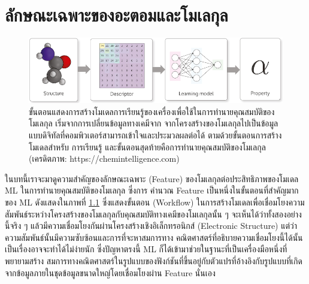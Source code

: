 

\chapter{ลักษณะเฉพาะของอะตอมและโมเลกุล}
\label{ch:feature}

\begin{figure}[htbp]
    \centering
    \includegraphics[width=\linewidth]{fig/workflow_chem_ml.png}
    \caption{ขั้นตอนแสดงการสร้างโมเดลการเรียนรู้ของเครื่องเพื่อใช้ในการทำนายคุณสมบัติของโมเลกุล เริ่มจากการเปลี่ยนข้อมูลทางเคมีจาก%
    จากโครงสร้างของโมเลกุลไปเป็นข้อมูลแบบดิจิทัลที่คอมพิวเตอร์สามารถเข้าใจและประมวลผลต่อได้ ตามด้วยขั้นตอนการสร้างโมเดลสำหรับ%
    การเรียนรู้ และขั้นตอนสุดท้ายคือการทำนายคุณสมบัติของโมเลกุล (เครดิตภาพ: https://chemintelligence.com)}
    \label{fig:workflow_chem_ml}
\end{figure}

ในบทนี้เราจะมาดูความสำคัญของลักษณะเฉพาะ (Feature) ของโมเลกุลต่อประสิทธิภาพของโมเดล ML ในการทำนายคุณสมบัติของโมเลกุล ซึ่งการ%
คำนวณ Feature เป็นหนึ่งในขั้นตอนที่สำคัญมากของ ML ดังแสดงในภาพที่ \ref{fig:workflow_chem_ml} ซึ่งแสดงขั้นตอน (Workflow) 
ในการสร้างโมเดลเพื่อเชื่อมโยงความสัมพันธ์ระหว่างโครงสร้างของโมเลกุลกับคุณสมบัติทางเคมีของโมเลกุลนั้น ๆ จะเห็นได้ว่าทั้งสองอย่างนี้จริง ๆ 
แล้วมีความเชื่อมโยงกันผ่านโครงสร้างเชิงอิเล็กทรอนิกส์ (Electronic Structure) แต่ว่าความสัมพันธ์นั้นมีความซับซ้อนและการที่จะหาสมการทาง%
คณิตศาสตร์ที่อธิบายความเชื่อมโยงนี้ได้นั้นเป็นเรื่องอาจจะทำได้ไม่ง่ายนัก ซึ่งปัญหาตรงนี้ ML ก็ได้เข้ามาช่วยในฐานะที่เป็นเครื่องมือหนึ่งที่พยายามสร้าง%
สมการทางคณิตศาสตร์ในรูปแบบของฟังก์ชันที่ขึ้นอยู่กับตัวแปรที่อ้างอิงกับรูปแบบที่เกิดจากข้อมูลภายในชุดข้อมูลขนาดใหญ่โดยเชื่อมโยงผ่าน Feature 
นั่นเอง

